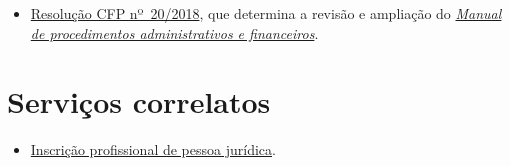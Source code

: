 \begin{itemize}
  \item  \href{https://transparencia.cfp.org.br/wp-content/uploads/sites/7/2020/05/Manual-de-Procedimentos-Administrativos-e-Financeiro-CFP-RES-20.2018.pdf}{\href{https://atosoficiais.com.br/cfp/resolucao-administrativa-financeira-n-20-2018-altera-o-manual-de-procedimentos-administrativo-e-financeiro-do-sistema-conselhos-de-psicologia-anexo-da-resolucao-cfp-n-202018-a-resolucao-cfp-n-03-2007-a-resolucao-cfp-n-16-2019-e-da-outras-providencias}{Resolução  CFP nº~20/2018}}, que determina a revisão e ampliação do  \href{https://transparencia.cfp.org.br/wp-content/uploads/sites/7/2020/05/Manual-de-Procedimentos-Administrativos-e-Financeiro-CFP-RES-20.2018.pdf}{\emph{Manual  de procedimentos administrativos e financeiros}}.
\end{itemize}

\section{Serviços correlatos}

\begin{itemize}
  \item  \hyperref[chap:pj-inscricao]{Inscrição  profissional de pessoa jurídica}.
\end{itemize}

\sumario